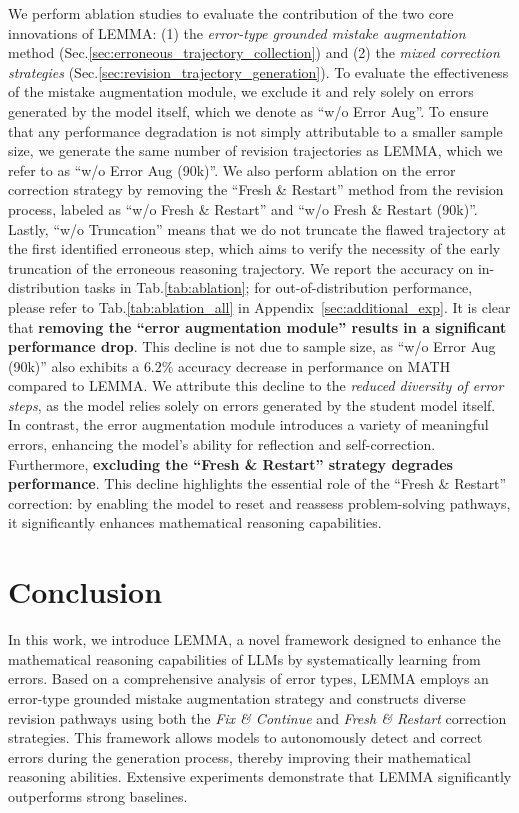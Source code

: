 \documentclass[11pt]{article}
\begin{document}
\noindent We perform ablation studies to evaluate the contribution of the two core innovations of LEMMA: (1) the \textit{error-type grounded mistake augmentation} method (Sec.\ref{sec:erroneous_trajectory_collection}) and (2) the \textit{mixed correction strategies} (Sec.\ref{sec:revision_trajectory_generation}). To evaluate the effectiveness of the mistake augmentation module, we 
exclude it and rely solely on errors generated by the model itself, which we denote as ``w/o Error Aug''. To ensure that any performance degradation is not simply attributable to a smaller sample size, we generate the same number of revision trajectories as LEMMA, which we refer to as ``w/o Error Aug (90k)''. 
We also perform ablation on the error correction strategy by removing the ``Fresh \& Restart'' method from the revision process, labeled as ``w/o Fresh \& Restart'' and ``w/o Fresh \& Restart (90k)''. Lastly, ``w/o Truncation'' means that we do not truncate the flawed trajectory at the first identified erroneous step, which aims to verify the necessity of the early truncation of the erroneous reasoning trajectory. We report the accuracy on in-distribution tasks in Tab.\ref{tab:ablation}; for out-of-distribution performance, please refer to Tab.\ref{tab:ablation_all} in Appendix~\ref{sec:additional_exp}. It is clear that \textbf{removing the ``error augmentation module'' results in a significant performance drop}. This decline is not due to sample size, as ``w/o Error Aug (90k)'' also exhibits a $6.2\%$ accuracy decrease in performance on MATH compared to LEMMA. We attribute this decline to the \textit{reduced diversity of error steps}, as the model relies solely on errors generated by the student model itself. In contrast, the error augmentation module introduces a variety of meaningful errors, enhancing the model's ability for reflection and self-correction.
Furthermore, \textbf{excluding the ``Fresh \& Restart'' strategy degrades performance}. This decline highlights the essential role of the ``Fresh \& Restart'' correction: by enabling the model to reset and reassess problem-solving pathways, it significantly enhances mathematical reasoning capabilities.

\section{Conclusion}

In this work, we introduce LEMMA, a novel framework designed to enhance the mathematical reasoning capabilities of LLMs by systematically learning from errors. Based on a comprehensive analysis of error types, LEMMA employs an error-type grounded mistake augmentation strategy and constructs diverse revision pathways using both the \textit{Fix \& Continue} and \textit{Fresh \& Restart} correction strategies. This framework allows models to autonomously detect and correct errors during the generation process, thereby improving their mathematical reasoning abilities. Extensive experiments demonstrate that LEMMA significantly outperforms strong baselines.
\end{document}
